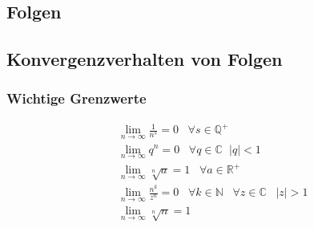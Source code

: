 \documentclass[8pt, a4paper, landscape, fleqn]{scrartcl}
\begin{document}
\begin{multicols*}{3}
		
		
		
		\section{Folgen}
			\subsection{Konvergenzverhalten von Folgen}
				\subsubsection{Wichtige Grenzwerte}
					\vspace{-10pt}
					\begin{align*}
						&\lim_{n\rightarrow \infty} \frac{1}{n^s}=0\hspace{10pt} \forall s\in \mathbb{Q^+} \hspace{5pt}\\
						&\lim_{n\rightarrow \infty} q^n=0 \hspace{10pt} \forall q\in \mathbb{C}\hspace{7pt} \vert q\vert <1\\					
						&\lim_{n\rightarrow \infty} \sqrt[n]{a}=1 \hspace{10pt} \forall a\in \mathbb{R^+} \hspace{5pt}\\
						&\lim_{n\rightarrow \infty} \frac{n^k}{z^n}=0 \hspace{10pt} \forall k \in \mathbb{N} \hspace{10pt} \forall z\in \mathbb{C} \hspace{10pt} \vert z\vert > 1\\						
						&\lim_{n\rightarrow \infty} \sqrt[n]{n}=1
					\end{align*}	

\end{multicols*}
\end{document}
